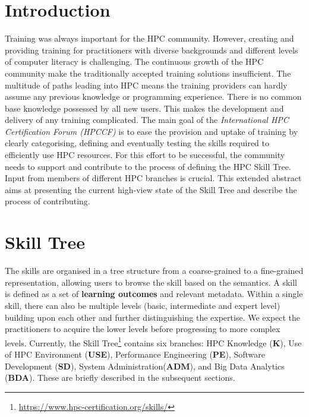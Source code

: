 \documentclass[jocse]{jocseart}
\begin{document}
\maketitle

\section{Introduction}

Training was always important for the HPC community. However, creating and providing training for practitioners with diverse backgrounds and different levels of computer literacy is challenging. The continuous growth of the HPC community make the traditionally accepted training solutions insufficient. The multitude of paths leading into HPC means the training providers can hardly assume any previous knowledge or programming experience. There is no common base knowledge possessed by all new users. This makes the development and delivery of any training complicated. 
The main goal of the \textit{International HPC Certification Forum (HPCCF)} is to ease the provision and uptake of training by clearly categorising, defining and eventually testing the skills required to efficiently use HPC resources. For this effort to be successful, the community needs to support and contribute to the process of defining the HPC Skill Tree. Input from members of different HPC branches is crucial. This extended abstract aims at presenting the current high-view state of the Skill Tree and describe the process of contributing. 


\section{Skill Tree}

The skills are organised in a tree structure from a coarse-grained to a fine-grained representation, allowing users to browse the skill based on the semantics. 
A skill is defined as a set of \textbf{learning outcomes} and relevant metadata. Within a single skill, there can also be multiple levels (basic, intermediate and expert level) building upon each other and further distinguishing the expertise. We expect the practitioners to acquire the lower levels before progressing to more complex levels.
Currently, the Skill Tree\footnote{\url{https://www.hpc-certification.org/skills/}} contains six branches: HPC Knowledge (\textbf{K}), Use of HPC Environment (\textbf{USE}), Performance Engineering (\textbf{PE}), Software Development (\textbf{SD}), System Administration(\textbf{ADM}), and Big Data Analytics (\textbf{BDA}). These are briefly described in the subsequent sections. 
\end{document}
